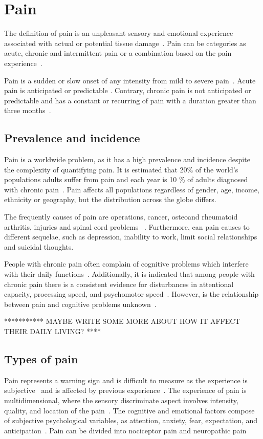 \section{Pain}
The definition of pain is an unpleasant sensory and emotional experience associated with actual or potential tissue damage~\cite{Steeds2013, Mello2016}. Pain can be categories as acute, chronic and intermittent pain or a combination based on the pain experience~\cite{Goldberg2011}. 

Pain is a sudden or slow onset of any intensity from mild to severe pain~\cite{Mello2016}. Acute pain is anticipated or predictable \cite{Mello2016}. Contrary,  chronic pain is not anticipated or predictable and has a constant or recurring of pain with a duration greater than three months~\cite{Mello2016}.


\subsection{Prevalence and incidence}
Pain is a worldwide problem, as it has a high prevalence and incidence despite the complexity of quantifying pain\cite{Goldberg2011}. It is estimated that 20\% of the world's populations adults suffer from pain and each year is 10 \% of adults diagnosed with chronic pain~\cite{Goldberg2011}. Pain affects all populations regardless of gender, age, income, ethnicity or geography, but the distribution across the globe differs\cite{Goldberg2011}. 

The frequently causes of pain are operations, cancer, osteoand rheumatoid arthritis, injuries and spinal cord problems ~\cite{Goldberg2011}. Furthermore, can pain causes to different sequelae, such as depression, inability to work, limit social relationships and suicidal thoughts\cite{Goldberg2011}. 

People with chronic pain often complain of cognitive problems which interfere with their daily functions~\cite{Geisser2018}. Additionally, it is indicated that among people with chronic pain there is a consistent evidence for disturbances in attentional capacity, processing speed, and psychomotor speed~\cite{Geisser2018}. However, is the relationship between pain and cognitive problems unknown~\cite{Geisser2018}. 

*********** MAYBE WRITE SOME MORE ABOUT HOW IT AFFECT THEIR DAILY LIVING? ****

\subsection{Types of pain}
Pain represents a warning sign and is difficult to measure as the experience is subjective~\cite{Steeds2013} and is affected by previous experience~\cite{Ahmad2014}. The experience of pain is multidimensional, where the sensory discriminate aspect involves intensity, quality, and location of the pain~\cite{Ahmad2014}. The cognitive and emotional factors compose of subjective psychological variables, as attention, anxiety, fear, expectation, and anticipation~\cite{Ahmad2014}. Pain can be divided into nociceptor pain and neuropathic pain~\cite{Steeds2013}

